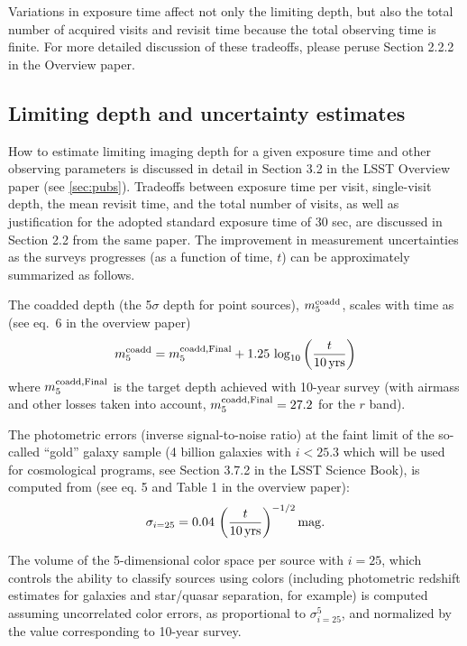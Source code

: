 \documentclass[DM,lsstdraft,toc,usenatbib]{lsstdoc}
\begin{document}
Variations in exposure time affect not only the limiting depth, but also the total number of 
acquired visits and revisit time because the total observing time is finite. For more detailed 
discussion of these tradeoffs, please peruse Section 2.2.2 in the Overview paper. 


\subsection{Limiting depth and uncertainty estimates}  

How to estimate limiting imaging depth for a given exposure time and other observing parameters
is discussed in detail in Section 3.2 in the LSST Overview paper (see \ref{sec:pubs}). Tradeoffs between 
exposure time per visit, single-visit depth, the mean revisit time, and the total number of visits,
as well as justification for the adopted standard exposure time of 30 sec, are discussed in Section 
2.2 from the same paper. The improvement in measurement uncertainties as the surveys progresses
(as a function of time, $t$) can be approximately summarized as follows. 

The coadded depth (the 5$\sigma$ depth for point sources), $m_5^{\rm coadd}$, scales 
with time as (see eq.~6 in the overview paper)  
\begin{equation} 
         m_5^{\rm coadd}  = m_5^{\rm coadd, Final}  + 1.25 \, \log_{10}\left({t \over 10 \, {\rm yrs}}\right) 
\end{equation} 
where $m_5^{\rm coadd, Final}$ is the target depth achieved with 10-year survey (with
airmass and other losses taken into account, $m_5^{\rm coadd, Final}=27.2$ for the $r$ band). 

The photometric errors (inverse signal-to-noise ratio) at the faint limit of the so-called 
``gold'' galaxy sample (4 billion galaxies with $i<25.3$ which will be used for cosmological
programs, see Section 3.7.2 in the LSST Science Book), is computed from (see eq. 5 and Table 1 
in the overview paper):
\begin{equation} 
                \sigma_{i=25} = 0.04 \, \left({t \over 10 \, {\rm yrs}}\right)^{-1/2} {\rm mag.}
\end{equation}

The volume of the 5-dimensional color space per source with $i=25$,  which controls the ability 
to classify sources using colors (including photometric redshift estimates for galaxies and star/quasar
separation, for example) is computed assuming uncorrelated color errors, as proportional
to $\sigma^5_{i=25}$, and normalized by the value corresponding to 10-year survey. 
\end{document}
